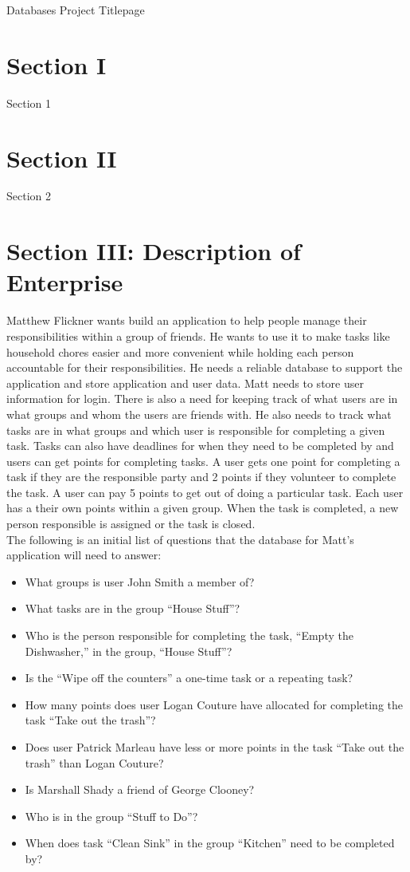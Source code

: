 \documentclass[a4paper]{article}
\begin{document}
\begin{titlepage}
Databases Project Titlepage
\end{titlepage}


\tableofcontents
\newpage

\section{Section I}
Section 1

\section{Section II}
Section 2

\section{Section III: Description of Enterprise}
Matthew Flickner wants build an application to help people manage their responsibilities within a group of friends. He wants to use it to make tasks like household chores easier and more convenient while holding each person accountable for their responsibilities. He needs a reliable database to support the application and store application and user data. Matt needs to store user information for login. There is also a need for keeping track of what users are in what groups and whom the users are friends with. He also needs to track what tasks are in what groups and which user is responsible for completing a given task. Tasks can also have deadlines for when they need to be completed by and users can get points for completing tasks. A user gets one point for completing a task if they are the responsible party and 2 points if they volunteer to complete the task. A user can pay 5 points to get out of doing a particular task. Each user has a their own points within a given group. When the task is completed, a new person responsible is assigned or the task is closed.
\\
The following is an initial list of questions that the database for Matt’s application will need to answer:
\begin{itemize}
\item What groups is user John Smith a member of?
\item What tasks are in the group “House Stuff”?
\item Who is the person responsible for completing the task, “Empty the Dishwasher,” in the group, “House Stuff”?
\item Is the “Wipe off the counters” a one-time task or a repeating task?
\item How many points does user Logan Couture have allocated for completing the task “Take out the trash”?
\item Does user Patrick Marleau have less or more points in the task “Take out the trash” than Logan Couture?
\item Is Marshall Shady a friend of George Clooney?
\item Who is in the group “Stuff to Do”?
\item When does task “Clean Sink” in the group “Kitchen” need to be completed by?
\end{itemize}
\end{document}
